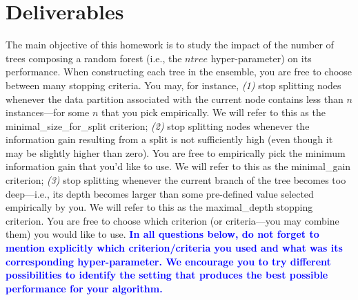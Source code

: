 \documentclass[letterpaper]{article}
\newcommand{\HIGHLIGHT}[1]{\textcolor{blue}{\textbf{#1}}}
\begin{document}
\section{Deliverables}

The main objective of this homework is to study the impact of the number of trees composing a  random forest (i.e., the $ntree$ hyper-parameter) on its performance. When constructing each tree in the ensemble, you are free to choose between many stopping criteria. You may, for instance, \textit{(1)} stop splitting nodes whenever the data partition associated with the current node contains less than $n$ instances---for some $n$ that you pick empirically. We will refer to this as the minimal\_size\_for\_split criterion; \textit{(2)} stop splitting nodes whenever the information gain resulting from a split is not sufficiently high (even though it may be slightly higher than zero). You are free to empirically pick the minimum information gain that you'd like to use. We will refer to this as the 
minimal\_gain criterion; \textit{(3)} stop splitting whenever the current branch of the tree becomes too deep---i.e., its depth becomes larger than some pre-defined value selected empirically by you. We will refer to this as the maximal\_depth stopping criterion. You are free to choose which criterion (or criteria---you may combine them) you would like to use. \HIGHLIGHT{In all questions below, do not forget to mention explicitly which criterion/criteria you used and what was its corresponding hyper-parameter. We encourage you to try different possibilities to identify the setting that produces the best possible performance for your algorithm.}

\vspace{2cm}
\end{document}
